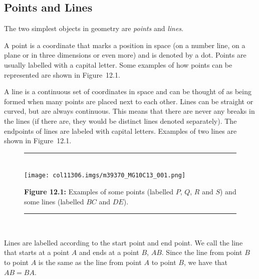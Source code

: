             \subsection{ Points and Lines}
            \nopagebreak
      \label{m39370*id313683}The two simplest objects in geometry are \textsl{points} and \textsl{lines}.\par 
      \label{m39370*id313697}A point is a coordinate that marks a position in space (on a number line, on a plane or in three dimensions or even more) and is denoted by a dot. Points are usually labelled with a capital letter. Some examples of how points can be represented are shown in Figure~12.1.\par 
      \label{m39370*id313707}A line is a continuous set of coordinates in space and can be thought of as being formed when many points are placed next to each other. Lines can be straight or curved, but are always continuous. This means that there are never any breaks in the lines (if there are, they would be distinct lines denoted separately). The endpoints of lines are labeled with capital letters. Examples of two lines are shown in Figure~12.1.\par 
    \setcounter{subfigure}{0}
	\begin{figure}[H] %
    \begin{center}
    \rule[.1in]{\figurerulewidth}{.005in} \\
        \label{m39370*uid7!!!underscore!!!media}\label{m39370*uid7!!!underscore!!!printimage}\texttt{[image: col11306.imgs/m39370\_MG10C13\_001.png]} %
      \vspace{2pt}
    \vspace{\rubberspace}\par \begin{cnxcaption}
	  \small \textbf{Figure 12.1: }Examples of some points (labelled $P$, $Q$, $R$ and $S$\hspace{1ex}) and some lines (labelled $BC$ and $DE$\hspace{1ex}).
	\end{cnxcaption}
    \vspace{.1in}
    \rule[.1in]{\figurerulewidth}{.005in} \\
    \end{center}
 \end{figure}       
      \label{m39370*id313170}Lines are labelled according to the start point and end point. We call the line that starts at a point $A$ and ends at a point $B$, $AB$. Since the line from point $B$ to point $A$ is the same as the line from point $A$ to point $B$, we have that $AB=BA$.\par 
